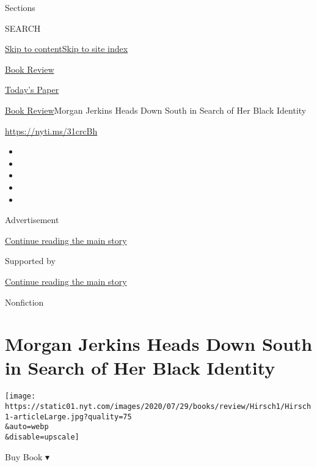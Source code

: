 Sections

SEARCH

\protect\hyperlink{site-content}{Skip to
content}\protect\hyperlink{site-index}{Skip to site index}

\href{https://www.nytimes.com/section/books/review}{Book Review}

\href{https://myaccount.nytimes.com/auth/login?response_type=cookie\&client_id=vi}{}

\href{https://www.nytimes.com/section/todayspaper}{Today's Paper}

\href{/section/books/review}{Book Review}\textbar{}Morgan Jerkins Heads
Down South in Search of Her Black Identity

\url{https://nyti.ms/31crcBh}

\begin{itemize}
\item
\item
\item
\item
\item
\end{itemize}

Advertisement

\protect\hyperlink{after-top}{Continue reading the main story}

Supported by

\protect\hyperlink{after-sponsor}{Continue reading the main story}

Nonfiction

\hypertarget{morgan-jerkins-heads-down-south-in-search-of-her-black-identity}{%
\section{Morgan Jerkins Heads Down South in Search of Her Black
Identity}\label{morgan-jerkins-heads-down-south-in-search-of-her-black-identity}}

\texttt{[image: https://static01.nyt.com/images/2020/07/29/books/review/Hirsch1/Hirsch1-articleLarge.jpg?quality=75\\\&auto=webp\\\&disable=upscale]}

Buy Book ▾


